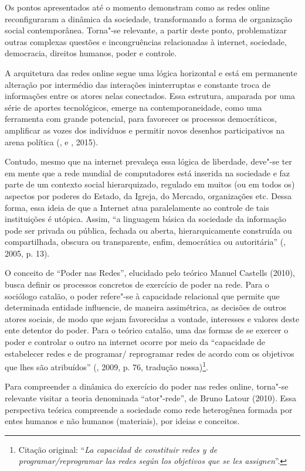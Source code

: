 Os pontos apresentados até o momento demonstram como as redes online
reconfiguraram a dinâmica da sociedade, transformando a forma de
organização social contemporânea. Torna"-se relevante, a partir deste
ponto, problematizar outras complexas questões e incongruências
relacionadas à internet, sociedade, democracia, direitos humanos, poder
e controle.

A arquitetura das redes online segue uma lógica horizontal e está em
permanente alteração por intermédio das interações ininterruptas e
constante troca de informações entre os atores nelas conectados. Essa
estrutura, amparada por uma série de aportes tecnológicos, emerge na
contemporaneidade, como uma ferramenta com grande potencial, para
favorecer os processos democráticos, amplificar as vozes dos indivíduos
e permitir novos desenhos participativos na arena política (,
 e , 2015).

Contudo, mesmo que na internet prevaleça essa lógica de liberdade,
deve"-se ter em mente que a rede mundial de computadores está inserida na
sociedade e faz parte de um contexto social hierarquizado, regulado em
muitos (ou em todos os) aspectos por poderes do Estado, da Igreja, do
Mercado, organizações etc. Dessa forma, essa ideia de que a Internet
atua paralelamente ao controle de tais instituições é utópica. Assim,
``a linguagem básica da sociedade da informação pode ser privada ou
pública, fechada ou aberta, hierarquicamente construída ou
compartilhada, obscura ou transparente, enfim, democrática ou
autoritária'' (, 2005, p. 13).

O conceito de ``Poder nas Redes'', elucidado pelo teórico Manuel
Castells (2010), busca definir os processos concretos de exercício de
poder na rede. Para o sociólogo catalão, o poder refere"-se à capacidade
relacional que permite que determinada entidade influencie, de maneira
assimétrica, as decisões de outros atores sociais, de modo que sejam
favorecidas a vontade, interesses e valores deste ente detentor do
poder. Para o teórico catalão, uma das formas de se exercer o poder e
controlar o outro na internet ocorre por meio da ``capacidade de
estabelecer redes e de programar/ reprogramar redes de acordo com os
objetivos que lhes são atribuídos'' (, 2009, p. 76, tradução nossa)\footnote{Citação original: ``\emph{La capacidad de constituir redes y de
  programar/reprogramar las redes según los objetivos que se les
  assignen}''.}.

Para compreender a dinâmica do exercício do poder nas redes online,
torna"-se relevante visitar a teoria denominada ``ator"-rede'', de Bruno
Latour (2010). Essa perspectiva teórica compreende a sociedade como rede
heterogênea formada por entes humanos e não humanos (materiais), por
ideias e conceitos.


